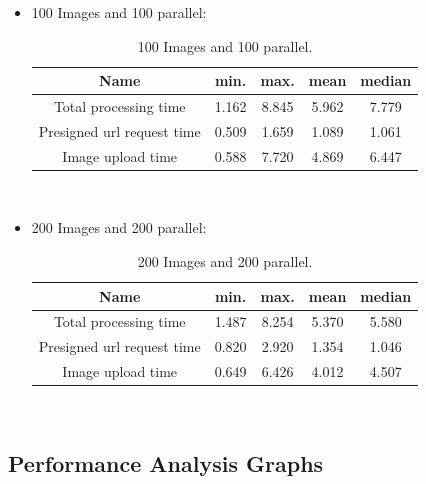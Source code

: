\documentclass[conference]{IEEEtran}
\begin{document}
\begin{itemize}
      \item 	 100 Images and 100 parallel:
            \begin{table}[ht]
                  \begin{tabulary}{\textwidth}{|C|C|C|C|C|}
                        \hline
                        \textbf{Name} &
                        \textbf{min.} &
                        \textbf{max.} &
                        \textbf{mean} &
                        \textbf{median}
                        \\\hline
                        Total processing time & 1.162 & 8.845 & 5.962 & 7.779  \\\hline
                        Presigned url request time & 0.509 & 1.659 & 1.089 & 1.061  \\\hline
                        Image upload time & 0.588 & 7.720 & 4.869 & 6.447  \\\hline
                  \end{tabulary}
                  \\
                  \caption{100 Images and 100 parallel.}
            \end{table}
      \item 	 200 Images and 200 parallel:
            \begin{table}[ht]
                  \begin{tabulary}{\textwidth}{|C|C|C|C|C|}
                        \hline
                        \textbf{Name} &
                        \textbf{min.} &
                        \textbf{max.} &
                        \textbf{mean} &
                        \textbf{median}

                        \\\hline
                        Total processing time & 1.487 & 8.254 & 5.370 & 5.580  \\\hline
                        Presigned url request time & 0.820 & 2.920 & 1.354 & 1.046 \\\hline
                        Image upload time & 0.649 & 6.426 & 4.012 & 4.507  \\\hline
                  \end{tabulary}
                  \\
                  \caption{200 Images and 200 parallel.}
            \end{table}
\end{itemize}
\subsection{Performance Analysis Graphs}
\end{document}
